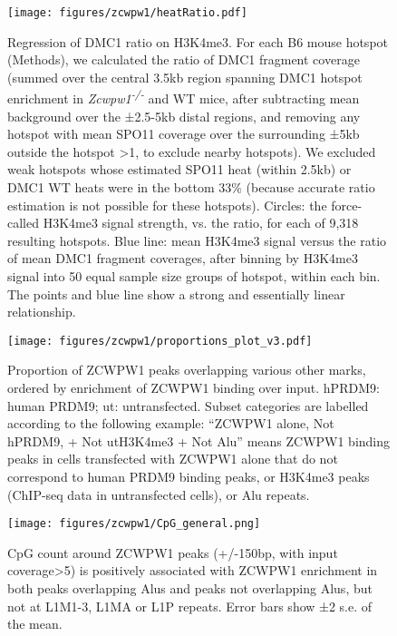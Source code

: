 \begin{figure}[H]
	\centering
	\texttt{[image: figures/zcwpw1/heatRatio.pdf]}
	\caption[DMC1 ratio regression]{
		Regression of DMC1 ratio on H3K4me3. For each B6 mouse hotspot (Methods), we calculated the ratio of DMC1 fragment coverage (summed over the central 3.5kb region spanning DMC1 hotspot enrichment in \textit{Zcwpw1\textsuperscript{-/-}} and WT mice, after subtracting mean background over the ±2.5-5kb distal regions, and removing any hotspot with mean SPO11 coverage over the surrounding ±5kb outside the hotspot >1, to exclude nearby hotspots). We excluded weak hotspots whose estimated SPO11 heat (within 2.5kb) or DMC1 WT heats were in the bottom 33\% (because accurate ratio estimation is not possible for these hotspots). Circles: the force-called H3K4me3 signal strength, vs. the ratio, for each of 9,318 resulting hotspots. Blue line: mean H3K4me3 signal versus the ratio of mean DMC1 fragment coverages, after binning by H3K4me3 signal into 50 equal sample size groups of hotspot, within each bin. The points and blue line show a strong and essentially linear relationship.
	}
	\label{fig:heatRatio}
\end{figure}


\begin{figure}[H]
	\centering
	\texttt{[image: figures/zcwpw1/proportions\_plot\_v3.pdf]}
	\caption[ChIPseq peaks proportions]{
		Proportion of ZCWPW1 peaks overlapping various other marks, ordered by enrichment of ZCWPW1 binding over input. hPRDM9: human PRDM9; ut: untransfected. Subset categories are labelled according to the following example: “ZCWPW1 alone, Not hPRDM9, + Not utH3K4me3 + Not Alu” means ZCWPW1 binding peaks in cells transfected with ZCWPW1 alone that do not correspond to human PRDM9 binding peaks, or H3K4me3 peaks (ChIP-seq data in untransfected cells), or Alu repeats.
	}
	\label{fig:proportions}
\end{figure}


\begin{figure}[H]
	\centering
	\texttt{[image: figures/zcwpw1/CpG\_general.png]}
	\caption[CpG counts for various repeats]{
		CpG count around ZCWPW1 peaks (+/-150bp, with input coverage>5) is positively associated with ZCWPW1 enrichment in both peaks overlapping Alus and peaks not overlapping Alus, but not at L1M1-3, L1MA or L1P repeats. Error bars show ±2 s.e. of the mean. 
	}
	\label{fig:CpG_general}
\end{figure}